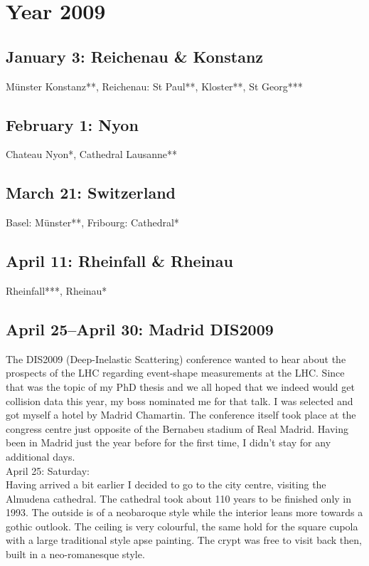\chapter{Year 2009}
\label{2009}

\section{January 3: Reichenau \& Konstanz}
\label{2009:Reichenau}

M\"unster Konstanz**, Reichenau: St Paul**, Kloster**, St Georg***

\section{February 1: Nyon}
\label{2009:Nyon}

Chateau Nyon*, Cathedral Lausanne**

\section{March 21: Switzerland}
\label{2009:Switzerland}

Basel: M\"unster**, Fribourg: Cathedral*

\section{April 11: Rheinfall \& Rheinau}
\label{2009:Rheinfall}

Rheinfall***, Rheinau*

\section{April 25--April 30: Madrid DIS2009}
\label{2009:Madrid}

The DIS2009 (Deep-Inelastic Scattering) conference wanted to hear about the prospects of the LHC regarding event-shape measurements at the LHC. Since that was the topic of my PhD thesis and we all hoped that we indeed would get collision data this year, my boss nominated me for that talk. I was selected and got myself a hotel by Madrid Chamartin. The conference itself took place at the congress centre just opposite of the Bernabeu stadium of Real Madrid. Having been in Madrid just the year before for the first time, I didn't stay for any additional days.\\

April 25: Saturday:\\
Having arrived a bit earlier I decided to go to the city centre, visiting the Almudena cathedral. The cathedral took about 110 years to be finished only in 1993. The outside is of a neobaroque style while the interior leans more towards a gothic outlook. The ceiling is very colourful, the same hold for the square cupola with a large traditional style apse painting. The crypt was free to visit back then, built in a neo-romanesque style.\\

